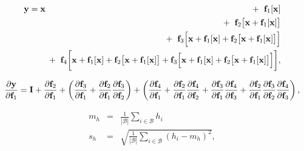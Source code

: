 \documentclass[letterpaper,twoside,openany, titlepage,oldfontcommands,titles,dvipsnames]{memoir}
\begin{document}
\begin{eqnarray}\label{eq:residual_substitute}
  &\mathbf{y} = \mathbf{x} &\hspace{-2mm}+\hspace{2mm} \mbox{\bf f}_{1}[\mathbf{x}] \\
  &&\hspace{-2mm}+\hspace{2mm} \mbox{\bf f}_{2}\bigl[\mathbf{x} + \mbox{\bf f}_{1}[\mathbf{x}]\bigr] \nonumber \\
  &&\hspace{-2mm}+\hspace{2mm} \mbox{\bf f}_{3}\Bigl[\mathbf{x} + \mbox{\bf f}_{1}[\mathbf{x}] + \mbox{\bf f}_{2}\bigl[\mathbf{x} + \mbox{\bf f}_{1}[\mathbf{x}]\bigr]\Bigr]\nonumber\\
  &&\hspace{-2mm}+\hspace{2mm}\mbox{\bf f}_{4}\biggl[\mathbf{x} + \mbox{\bf f}_{1}[\mathbf{x}] + \mbox{\bf f}_{2}\bigl[\mathbf{x} + \mbox{\bf f}_{1}[\mathbf{x}]\bigr]+ \mbox{\bf f}_{3}\Bigl[\mathbf{x} + \mbox{\bf f}_{1}[\mathbf{x}] + \mbox{\bf f}_{2}\bigl[\mathbf{x} + \mbox{\bf f}_{1}[\mathbf{x}]\bigr]\Bigr]\biggr],\nonumber
 \end{eqnarray}

\begin{eqnarray}\label{eq:residual_deriv}
  \frac{\partial \mathbf{y}}{\partial \mbox{\bf f}_{1}} = \mathbf{I} + \frac{\partial \mathbf{f}_{2}}{\partial \mathbf{f}_1} + \left(\frac{\partial \mathbf{f}_{3}}{\partial \mathbf{f}_1}+ \frac{\partial \mathbf{f}_{2}}{\partial \mathbf{f}_1}\frac{\partial \mathbf{f}_{3}}{\partial \mathbf{f}_2} \right)
  + \left(\frac{\partial \mathbf{f}_{4}}{\partial \mathbf{f}_1}
  + \frac{\partial \mathbf{f}_{2}}{\partial \mathbf{f}_1}\frac{\partial \mathbf{f}_{4}}{\partial \mathbf{f}_2}
  + \frac{\partial \mathbf{f}_{3}}{\partial \mathbf{f}_1}\frac{\partial \mathbf{f}_{4}}{\partial \mathbf{f}_3}
  + \frac{\partial \mathbf{f}_{2}}{\partial \mathbf{f}_1}\frac{\partial \mathbf{f}_{3}}{\partial \mathbf{f}_2}\frac{\partial \mathbf{f}_{4}}{\partial \mathbf{f}_3}\right),
 \end{eqnarray}

\begin{eqnarray}
 m_{h} &=& \frac{1}{|\mathcal{B}|} \sum_{i\in\mathcal{B}} h_{i}\nonumber \\
 s_{h} &=& \sqrt{\frac{1}{|\mathcal{B}|} \sum_{i\in\mathcal{B}} (h_{i}-m_{h})^2},
 \end{eqnarray}
\end{document}

